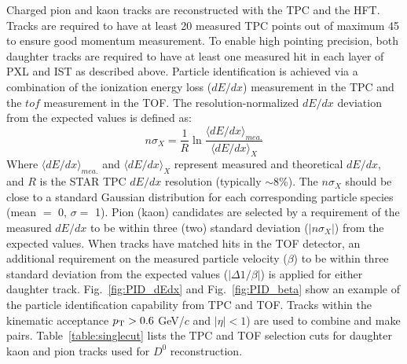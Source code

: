\documentclass[%
 reprint,	
 amsmath,amssymb,
 aps,
 prc,
]{revtex4-1}
\begin{document}
Charged pion and kaon tracks are reconstructed with the TPC and the HFT. Tracks are required to have at least 20 measured TPC points out of maximum 45 to ensure good momentum measurement. To enable high pointing precision, both daughter tracks are required to have at least one measured hit in each layer of PXL and IST as described above. Particle identification is achieved via a combination of the ionization energy loss ($dE/dx$) measurement in the TPC and the $tof$ measurement in the TOF. The resolution-normalized $dE/dx$ deviation from the expected values is defined as:
\[
n\sigma_X = \frac{1}{R}\ln\frac{\langle{dE/dx}\rangle_{mea.}}{\langle{dE/dx}\rangle_{X}}
\]
Where $\langle{dE/dx}\rangle_{mea.}$ and $\langle{dE/dx}\rangle_{X}$ represent measured and theoretical $dE/dx$, and $R$ is the STAR TPC $dE/dx$ resolution (typically $\sim$8\%). The $n\sigma_X$ should be close to a standard Gaussian distribution for each corresponding particle species (mean $=$ 0, $\sigma = $ 1).
Pion (kaon) candidates are selected by a requirement of the measured $dE/dx$ to be within three (two) standard deviation ($|n\sigma_{X}|$) from the expected values. When tracks have matched hits in the TOF detector, an additional requirement on the measured particle velocity ($\beta$) to be within three standard deviation from the expected values ($|\Delta 1/\beta|$) is applied for either daughter track. Fig.~\ref{fig:PID_dEdx} and Fig.~\ref{fig:PID_beta} show an example of the particle identification capability from TPC and TOF. Tracks within the kinematic acceptance $p_{\rm T}>0.6$ GeV/$c$ and $|\eta|<1$) are used to combine and make pairs. Table~\ref{table:singlecut} lists the TPC and TOF selection cuts for daughter kaon and pion tracks used for $D^0$ reconstruction.

\begin{table}
\label{table:singlecut} 
\end{table}
\end{document}
